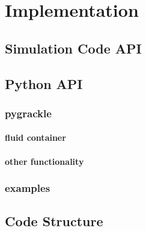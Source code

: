 \section{Implementation} \label{methods:code}



\subsection{Simulation Code API}


\subsection{Python API}

\subsubsection{pygrackle}

\paragraph{fluid container}

\paragraph{other functionality}


\subsubsection{examples}


\subsection{Code Structure} \label{Code_Structure}


\subsection{}

